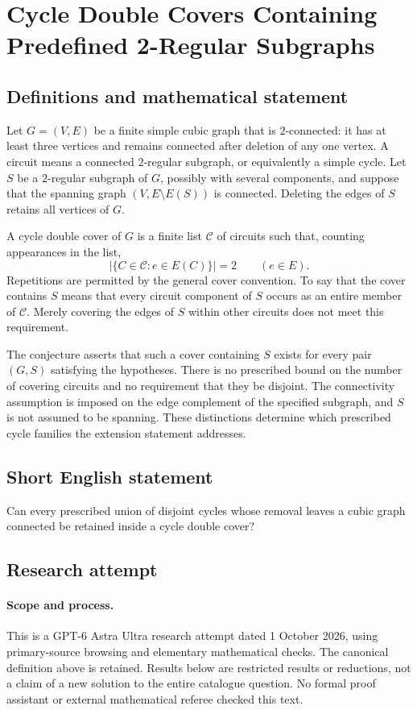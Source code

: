 \documentclass[11pt,a4paper]{article}
\begin{document}
\section*{Cycle Double Covers Containing Predefined 2-Regular Subgraphs}\label{statement}

\subsection{Definitions and mathematical statement}
Let $G=(V,E)$ be a finite simple cubic graph that is $2$-connected:
it has at least three vertices and remains connected after deletion
of any one vertex. A circuit means a connected $2$-regular subgraph,
or equivalently a simple cycle. Let $S$ be a $2$-regular subgraph
of $G$, possibly with several components, and suppose that the
spanning graph $(V,E\setminus E(S))$ is connected. Deleting the edges
of $S$ retains all vertices of $G$.

A cycle double cover of $G$ is a finite list $\mathcal C$ of circuits
such that, counting appearances in the list,
\[
 \bigl|\{C\in\mathcal C:e\in E(C)\}\bigr|=2
 \qquad(e\in E).
\]
Repetitions are permitted by the general cover convention. To say
that the cover contains $S$ means that every circuit component of
$S$ occurs as an entire member of $\mathcal C$. Merely covering the
edges of $S$ within other circuits does not meet this requirement.

The conjecture asserts that such a cover containing $S$ exists for
every pair $(G,S)$ satisfying the hypotheses. There is no prescribed
bound on the number of covering circuits and no requirement that
they be disjoint. The connectivity assumption is imposed on the
edge complement of the specified subgraph, and $S$ is not assumed
to be spanning. These distinctions determine which prescribed
cycle families the extension statement addresses.
\subsection{Short English statement}
Can every prescribed union of disjoint cycles whose removal leaves a cubic graph connected be retained inside a cycle double cover?
\subsection{Research attempt}
\paragraph{Scope and process.}
This is a GPT-6 Astra Ultra research attempt dated 1 October 2026, using
primary-source browsing and elementary mathematical checks. The canonical
definition above is retained. Results below are restricted results or
reductions, not a claim of a new solution to the entire catalogue question.
No formal proof assistant or external mathematical referee checked this text.
\end{document}
